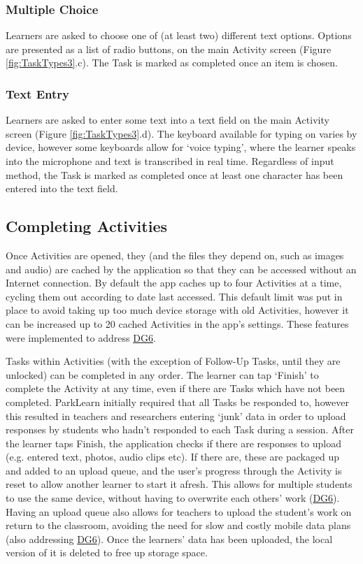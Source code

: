 \subsubsection*{Multiple Choice}
Learners are asked to choose one of (at least two) different text options. Options are presented as a list of radio buttons, on the main Activity screen (Figure \ref{fig:TaskTypes3}.c). The Task is marked as completed once an item is chosen.

\subsubsection*{Text Entry}
Learners are asked to enter some text into a text field on the main Activity screen (Figure \ref{fig:TaskTypes3}.d). The keyboard available for typing on varies by device, however some keyboards allow for `voice typing', where the learner speaks into the microphone and text is transcribed in real time. Regardless of input method, the Task is marked as completed once at least one character has been entered into the text field. 

\subsection{Completing Activities}

Once Activities are opened, they (and the files they depend on, such as images and audio) are cached by the application so that they can be accessed without an Internet connection. By default the app caches up to four Activities at a time, cycling them out according to date last accessed. This default limit was put in place to avoid taking up too much device storage with old Activities, however it can be increased up to 20 cached Activities in the app's settings. These features were implemented to address \hyperref[DG6]{DG6}.

Tasks within Activities (with the exception of Follow-Up Tasks, until they are unlocked) can be completed in any order. The learner can tap `Finish' to complete the Activity at any time, even if there are Tasks which have not been completed. ParkLearn initially required that all Tasks be responded to, however this resulted in teachers and researchers entering `junk' data in order to upload responses by students who hadn't responded to each Task during a session. After the learner taps Finish, the application checks if there are responses to upload (e.g. entered text, photos, audio clips etc). If there are, these are packaged up and added to an upload queue, and the user's progress through the Activity is reset to allow another learner to start it afresh. This allows for multiple students to use the same device, without having to overwrite each others' work (\hyperref[DG6]{DG6}). Having an upload queue also allows for teachers to upload the student's work on return to the classroom, avoiding the need for slow and costly mobile data plans (also addressing \hyperref[DG6]{DG6}). Once the learners' data has been uploaded, the local version of it is deleted to free up storage space.

